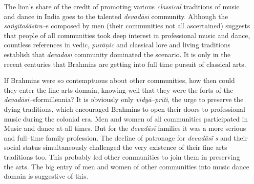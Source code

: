 The lion’s share of the credit of promoting various \textit{classical} traditions of music and dance in India goes to the talented \textit{devadāsī} community. Although the \textit{saṅgīta}\textit{śāstra–}s composed by men (their communities not all ascertained) suggests that people of all communities took deep interest in professional music and dance, countless references in vedic, \textit{purāṇic} and classical lore and living traditions establish that \textit{devadāsī} community dominated the scenario.  It is only in the recent centuries that Brahmins are getting into full time pursuit of classical arts.

If Brahmins were so contemptuous about other communities, how then could they enter the fine arts domain, knowing well that they were the forts of the \textit{devadāsī–}sformillennia? It is obviously only \textit{vidyā}–\textit{prīti}, the urge to preserve the dying traditions, which encouraged Brahmins to open their doors to professional music during the colonial era. Men and women of all communities participated in Music and dance at all times. But for the \textit{devadāsī} families it was a more serious and full–time family profession. The decline of patronage for \textit{devadāsī s} and their social status simultaneously challenged the very existence of their fine arts traditions too. This probably led other communities to join them in preserving the arts. The big entry of men and women of other communities into music dance domain is suggestive of this.

